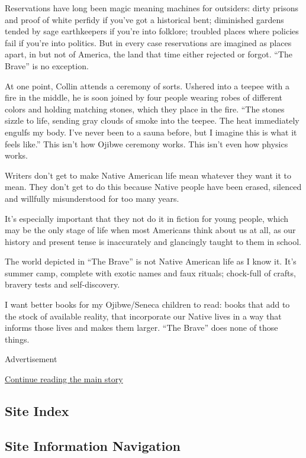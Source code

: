Reservations have long been magic meaning machines for outsiders: dirty
prisons and proof of white perfidy if you've got a historical bent;
diminished gardens tended by sage earthkeepers if you're into folklore;
troubled places where policies fail if you're into politics. But in
every case reservations are imagined as places apart, in but not of
America, the land that time either rejected or forgot. ``The Brave'' is
no exception.

At one point, Collin attends a ceremony of sorts. Ushered into a teepee
with a fire in the middle, he is soon joined by four people wearing
robes of different colors and holding matching stones, which they place
in the fire. ``The stones sizzle to life, sending gray clouds of smoke
into the teepee. The heat immediately engulfs my body. I've never been
to a sauna before, but I imagine this is what it feels like.'' This
isn't how Ojibwe ceremony works. This isn't even how physics works.

Writers don't get to make Native American life mean whatever they want
it to mean. They don't get to do this because Native people have been
erased, silenced and willfully misunderstood for too many years.

It's especially important that they not do it in fiction for young
people, which may be the only stage of life when most Americans think
about us at all, as our history and present tense is inaccurately and
glancingly taught to them in school.

The world depicted in ``The Brave'' is not Native American life as I
know it. It's summer camp, complete with exotic names and faux rituals;
chock-full of crafts, bravery tests and self-discovery.

I want better books for my Ojibwe/Seneca children to read: books that
add to the stock of available reality, that incorporate our Native lives
in a way that informs those lives and makes them larger. ``The Brave''
does none of those things.

Advertisement

\protect\hyperlink{after-bottom}{Continue reading the main story}

\hypertarget{site-index}{%
\subsection{Site Index}\label{site-index}}

\hypertarget{site-information-navigation}{%
\subsection{Site Information
Navigation}\label{site-information-navigation}}

